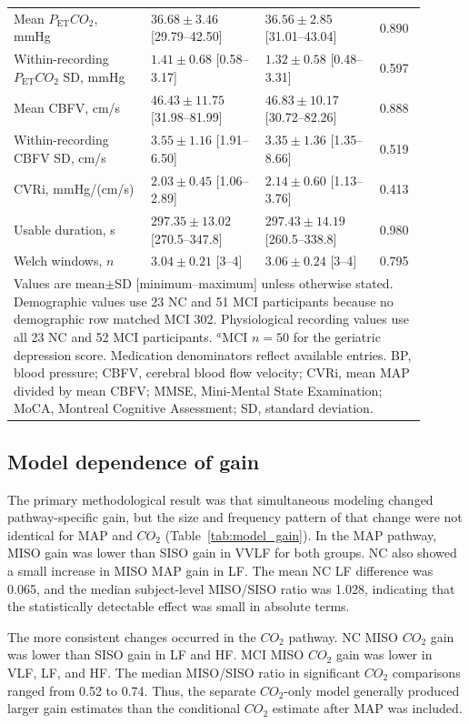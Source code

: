 \documentclass[12pt]{article}
\newcommand{\PETCOtwo}{P_{\mathrm{ET}}CO_2}
\newcommand{\COtwo}{CO_2}
\begin{document}
\begin{longtable}{p{0.30\linewidth}p{0.25\linewidth}p{0.25\linewidth}p{0.10\linewidth}}
Mean $\PETCOtwo$, mmHg & $36.68\pm3.46$ [29.79--42.50] & $36.56\pm2.85$ [31.01--43.04] & 0.890 \\
Within-recording $\PETCOtwo$ SD, mmHg & $1.41\pm0.68$ [0.58--3.17] & $1.32\pm0.58$ [0.48--3.31] & 0.597 \\
Mean CBFV, cm/s & $46.43\pm11.75$ [31.98--81.99] & $46.83\pm10.17$ [30.72--82.26] & 0.888 \\
Within-recording CBFV SD, cm/s & $3.55\pm1.16$ [1.91--6.50] & $3.35\pm1.36$ [1.35--8.66] & 0.519 \\
CVRi, mmHg/(cm/s) & $2.03\pm0.45$ [1.06--2.89] & $2.14\pm0.60$ [1.13--3.76] & 0.413 \\
Usable duration, s & $297.35\pm13.02$ [270.5--347.8] & $297.43\pm14.19$ [260.5--338.8] & 0.980 \\
Welch windows, $n$ & $3.04\pm0.21$ [3--4] & $3.06\pm0.24$ [3--4] & 0.795 \\
\bottomrule
\multicolumn{4}{p{0.94\linewidth}}{\footnotesize Values are mean$\pm$SD
[minimum--maximum] unless otherwise stated. Demographic values use 23 NC and
51 MCI participants because no demographic row matched MCI 302. Physiological
recording values use all 23 NC and 52 MCI participants. $^{a}$MCI $n=50$ for
the geriatric depression score. Medication denominators reflect available
entries. BP, blood pressure; CBFV, cerebral blood flow velocity; CVRi, mean
MAP divided by mean CBFV; MMSE, Mini-Mental State Examination; MoCA, Montreal
Cognitive Assessment; SD, standard deviation.}\\
\end{longtable}

\subsection{Model dependence of gain}

The primary methodological result was that simultaneous modeling changed
pathway-specific gain, but the size and frequency pattern of that change were
not identical for MAP and $\COtwo$ (Table~\ref{tab:model_gain}). In the MAP
pathway, MISO gain was lower than SISO gain in VVLF for both groups. NC also
showed a small increase in MISO MAP gain in LF. The mean NC LF difference was
0.065, and the median subject-level MISO/SISO ratio was 1.028, indicating that
the statistically detectable effect was small in absolute terms.

The more consistent changes occurred in the $\COtwo$ pathway. NC MISO
$\COtwo$ gain was lower than SISO gain in LF and HF. MCI MISO $\COtwo$ gain
was lower in VLF, LF, and HF. The median MISO/SISO ratio in significant
$\COtwo$ comparisons ranged from 0.52 to 0.74. Thus, the separate $\COtwo$-only
model generally produced larger gain estimates than the conditional
$\COtwo$ estimate after MAP was included.
\end{document}
